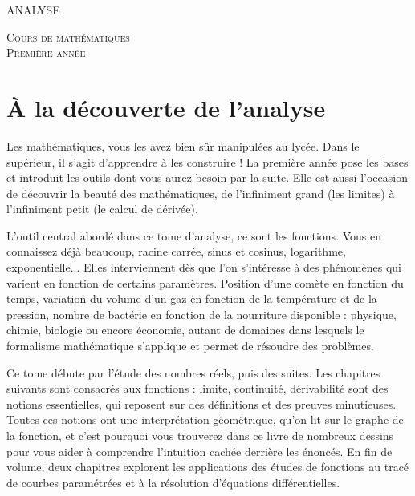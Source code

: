 
\pagestyle{empty}\thispagestyle{empty}
\vspace*{\fill}
\begin{center}
\fontsize{52}{52}\selectfont
\textsc{ANALYSE}
\end{center}
\vfill
\begin{center}
\huge
\textsc{Cours de mathématiques}\\ 
\textsc{Première année}
\end{center}

\begin{center}
\end{center}
\clearemptydoublepage
\thispagestyle{empty}

\vspace*{\fill}
\section*{À la découverte de l'analyse}
 
 
Les mathématiques, vous les avez bien sûr manipulées au lycée. Dans le supérieur, il s'agit d'apprendre à les construire ! La première année pose les bases et introduit les outils dont vous aurez besoin par la suite. Elle est aussi l'occasion de découvrir la beauté des mathématiques, de l'infiniment grand (les limites) à l'infiniment petit (le calcul de dérivée).


L'outil central abordé dans ce tome d'analyse, ce sont les fonctions. Vous en connaissez déjà beaucoup, racine carrée, sinus et cosinus, logarithme, exponentielle... Elles interviennent dès que l'on s'intéresse à des phénomènes qui varient en fonction de certains paramètres. Position d'une comète en fonction du temps, variation du volume d'un gaz en fonction de la température et de la pression, nombre de bactérie en fonction de la nourriture disponible : physique, chimie, biologie ou encore économie, autant de domaines dans lesquels le formalisme mathématique s'applique et permet de résoudre des problèmes.

\medskip

Ce tome débute par l'étude des nombres réels, puis des suites. Les chapitres suivants sont consacrés aux fonctions : limite, continuité, dérivabilité sont des notions essentielles, qui reposent sur des définitions et des preuves minutieuses. Toutes ces notions ont une interprétation géométrique, qu'on lit sur le graphe de la fonction, et c'est pourquoi vous trouverez dans ce livre de nombreux dessins pour vous aider à comprendre l'intuition cachée derrière les énoncés. En fin de volume, deux chapitres explorent les applications des études de fonctions au tracé de courbes paramétrées et à la résolution d'équations différentielles.

